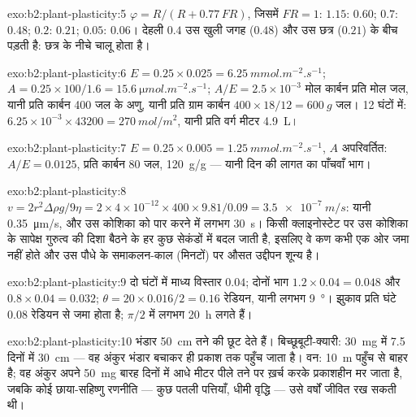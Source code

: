 \begin{solution}{exo:b2:plant-plasticity:5}
$\varphi = R/(R + 0.77\,FR)$, जिसमें $FR = 1$: $1.15$: $0.60$; $0.7$:
$0.48$; $0.2$: $0.21$; $0.05$: $0.06$। देहली $0.4$ उस खुली जगह
($0.48$) और उस छत्र ($0.21$) के बीच पड़ती है: 
छत्र के नीचे चालू होता है।
\end{solution}

\begin{solution}{exo:b2:plant-plasticity:6}
$E = 0.25\times 0.025 = \qty{6.25}{mmol.m^{-2}.s^{-1}}$; $A =
0.25\times 100/1.6 = \qty{15.6}{\micro mol.m^{-2}.s^{-1}}$; $A/E =
2.5\times 10^{-3}$ मोल कार्बन प्रति मोल जल, यानी प्रति कार्बन 400 जल
के अणु, यानी प्रति ग्राम कार्बन $400\times 18/12 = \qty{600}{g}$
जल। 12 घंटों में: $6.25\times 10^{-3}\times 43200 =
\qty{270}{mol/m^2}$, यानी प्रति वर्ग मीटर \qty{4.9}{L}।
\end{solution}

\begin{solution}{exo:b2:plant-plasticity:7}
$E = 0.25\times 0.005 = \qty{1.25}{mmol.m^{-2}.s^{-1}}$, $A$
अपरिवर्तित: $A/E = 0.0125$, प्रति कार्बन 80 जल, \qty{120}{g/g} ---
यानी दिन की लागत का पाँचवाँ भाग।
\end{solution}

\begin{solution}{exo:b2:plant-plasticity:8}
$v = 2r^{2}\Delta\rho g/9\eta = 2\times 4\times 10^{-12}\times
400\times 9.81/0.09 = \qty{3.5e-7}{m/s}$: यानी \qty{0.35}{\micro m/s},
और उस कोशिका को पार करने में लगभग \qty{30}{s}। किसी क्लाइनोस्टेट पर उस
कोशिका के सापेक्ष गुरुत्व की दिशा बैठने के हर कुछ सेकंडों में बदल जाती
है, इसलिए वे कण कभी एक ओर जमा नहीं होते और उस पौधे के समाकलन-काल (मिनटों)
पर औसत उद्दीपन शून्य है।
\end{solution}

\begin{solution}{exo:b2:plant-plasticity:9}
दो घंटों में माध्य विस्तार $0.04$; दोनों भाग $1.2\times 0.04 = 0.048$
और $0.8\times 0.04 = 0.032$; $\theta = 20\times 0.016/2 = 0.16$
रेडियन, यानी लगभग \qty{9}{\degree}। झुकाव प्रति घंटे $0.08$ रेडियन से
जमा होता है; $\pi/2$ में लगभग \qty{20}{h} लगते हैं।
\end{solution}

\begin{solution}{exo:b2:plant-plasticity:10}
भंडार \qty{50}{cm} तने की छूट देते हैं। बिच्छूबूटी-क्यारी: \qty{30}{mg}
में 7.5 दिनों में \qty{30}{cm} --- वह अंकुर भंडार बचाकर ही
प्रकाश तक पहुँच जाता है। वन: \qty{10}{m} पहुँच से बाहर है; वह अंकुर
अपने \qty{50}{mg} बारह दिनों में आधे मीटर पीले तने पर ख़र्च करके
प्रकाशहीन मर जाता है, जबकि कोई छाया-सहिष्णु रणनीति --- कुछ पतली
पत्तियाँ, धीमी वृद्धि --- उसे वर्षों जीवित रख सकती थी।
\end{solution}

